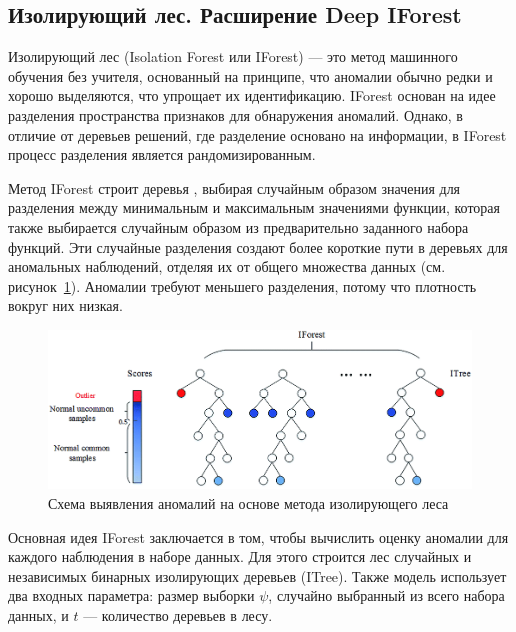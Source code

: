 \subsection{Изолирующий лес. Расширение Deep IForest}

Изолирующий лес (Isolation Forest или IForest) --- это метод машинного обучения без учителя, основанный на принципе, что аномалии обычно редки и хорошо выделяются, что упрощает их идентификацию. IForest основан на идее разделения пространства признаков для обнаружения аномалий. Однако, в отличие от деревьев решений, где разделение основано на информации, в IForest процесс разделения является рандомизированным.

Метод IForest строит деревья \cite{Short-outlier-methods-overview}, выбирая случайным образом значения для разделения между минимальным и максимальным значениями функции, которая также выбирается случайным образом из предварительно заданного набора функций. Эти случайные разделения создают более короткие пути в деревьях для аномальных наблюдений, отделяя их от общего множества данных (см. рисунок~\ref{fig:iforest-scheme}). Аномалии требуют меньшего разделения, потому что плотность вокруг них низкая.

\begin{figure}
  \centering
  \includegraphics[scale=0.45]{inc/images/iforest-scheme.png}
  \caption{Схема выявления аномалий на основе метода изолирующего леса \cite{Short-outlier-methods-overview}}
  \label{fig:iforest-scheme}
\end{figure}

Основная идея IForest заключается в том, чтобы вычислить оценку аномалии для каждого наблюдения в наборе данных. Для этого строится лес случайных и независимых бинарных изолирующих деревьев (ITree). Также модель использует два входных параметра: размер выборки $\psi$, случайно выбранный из всего набора данных, и $t$ --- количество деревьев в лесу.

\newpage

